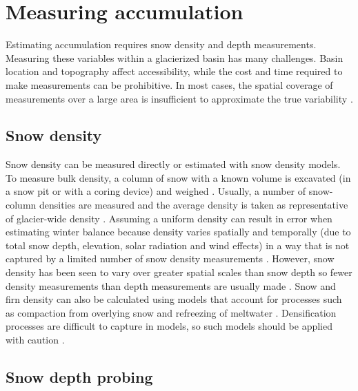 \documentclass{sfuthesis}
\begin{document}
\section{Measuring accumulation}
Estimating accumulation requires snow density and depth measurements. Measuring these variables within a glacierized basin has many challenges. Basin location and topography affect accessibility, while the cost and time required to make measurements can be prohibitive. In most cases, the spatial coverage of measurements over a large area is insufficient to approximate the true variability \citep{Bloeschl1999, Deems2006a}.

\subsection{Snow density}

Snow density can be measured directly or estimated with snow density models. To measure bulk density, a column of snow with a known volume is excavated (in a snow pit or with a coring device) and weighed \citep[e.g.][]{Sold2013, Sold2014}. Usually, a number of snow-column densities are measured and the average density is taken as representative of glacier-wide density \citep[e.g.][]{Machguth2006, Grunewald2010, McGrath2015}. Assuming a uniform density can result in error when estimating winter balance because density varies spatially and temporally (due to total snow depth, elevation, solar radiation and wind effects) in a way that is not captured by a limited number of snow density measurements \citep{Grunewald2010, Wetlaufer2016}. However, snow density has been seen to vary over greater spatial scales than snow depth so fewer density measurements than depth measurements are usually made \citep{Elder1998, Clark2011}. Snow and firn density can also be calculated using models that account for processes such as compaction from overlying snow and refreezing of meltwater \citep{Herron1980, Sold2014}. Densification processes are difficult to capture in models, so such models should be applied with caution \citep{Mellor1974}.

\subsection{Snow depth probing}
\end{document}
